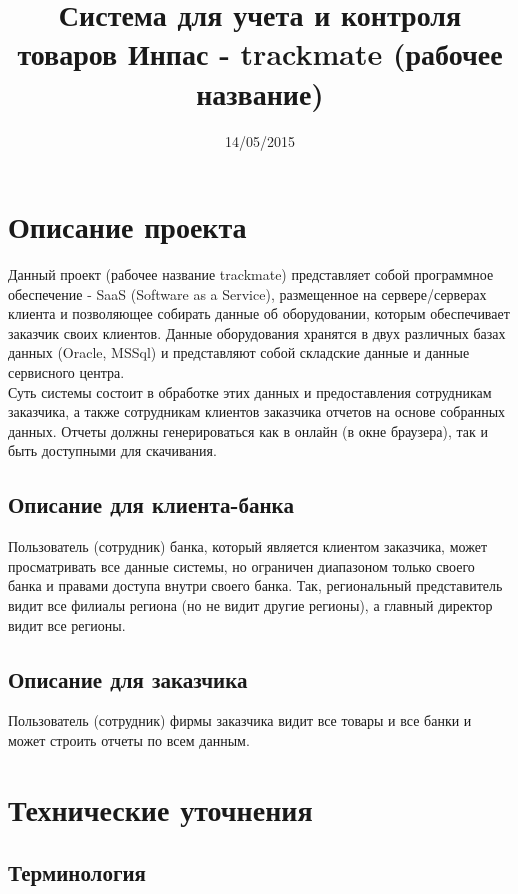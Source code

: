 \documentclass[DIV=calc, paper=a4, fontsize=11pt]{scrartcl} %
\title{Система для учета и контроля товаров Инпас - trackmate (рабочее название)}
\date{14/05/2015}
\begin{document}
\maketitle

\section{Описание проекта}

Данный проект (рабочее название trackmate) представляет собой программное обеспечение - SaaS (Software as a Service), размещенное на сервере/серверах клиента и позволяющее собирать данные об оборудовании, которым обеспечивает заказчик своих клиентов. Данные оборудования хранятся в двух различных базах данных (Oracle, MSSql) и представляют собой складские данные и данные сервисного центра.
\\[0.5cm]
Суть системы состоит в обработке этих данных и предоставления сотрудникам заказчика, а также сотрудникам клиентов заказчика отчетов на основе собранных данных. Отчеты должны генерироваться как в онлайн (в окне браузера), так и быть доступными для скачивания.

\subsection{Описание для клиента-банка}
Пользователь (сотрудник) банка, который является клиентом заказчика, может просматривать все данные системы, но ограничен диапазоном только своего банка и правами доступа внутри своего банка. Так, региональный представитель видит все филиалы региона (но не видит другие регионы), а главный директор видит все регионы.

\subsection{Описание для заказчика}
Пользователь (сотрудник) фирмы заказчика видит все товары и все банки и может строить отчеты по всем данным.

\section{Технические уточнения}

\subsection{Терминология}
        
\end{document}
